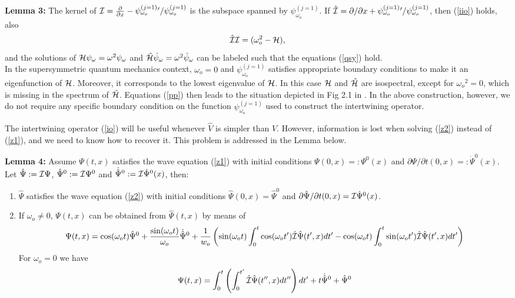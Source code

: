 \documentclass[aps,floats,showpacs,amssymb,tightenlines]{revtex4}
\def\w{\omega}
\def\p{\partial}
\def\I{{\cal I}}
\def\po{\psi_{\w_o}}
\def\pe{\psi_{\w_o}^{(j=1)}{}}
\begin{document}
\noindent
{\bf Lemma 3:}  The kernel of $\I = \frac{\p}{\p x} - \psi _{\w_o}^{(j=1)} {}' / \psi _{\w_o}^{(j=1)}$
is the subspace spanned by $\po ^{(j=1)}$.  If $ \hat \I  =  \p/\p x +
 \psi _{\w_o}^{(j=1)} {}' / \psi _{\w_o}^{(j=1)}$, then (\ref{iio}) holds, also
 \begin{equation} \label{inverse}
 \hat \I \I = (\w_o^2 - {\cal H}),
\end{equation}
  and  the solutions of ${\cal H} \psi_{\w} = \w^2 \psi_{\w}$ and $\hat {\cal H} \hat \psi_{\w} = \w^2 \hat \psi_{\w}$
can be labeled such that the equations (\ref{qsy}) hold.\\

In the supersymmetric quantum mechanics context, $\w_o=0$ and $\psi _{\w_o}^{(j=1)}$ satisfies appropriate boundary conditions to make it
 an eigenfunction of ${\cal H}$. Moreover, it  corresponds to the lowest eigenvalue of ${\cal H}$.
In this case  ${\cal H}$ and $\hat {\cal H}$ are isospectral, except for $\w_o{}^2=0$, which is missing in the spectrum of $\hat {\cal H}$.
 Equations (\ref{pp}) then leads to the situation
depicted in Fig 2.1 in \cite{cooper}. In the above construction, however, we do not require any specific boundary condition
on the function $\pe$ used to construct the intertwining operator.


\vspace{.3cm}

The intertwining  operator (\ref{io}) will be useful whenever  $\hat V$ is simpler than
$V$. However, information is lost when solving (\ref{z2}) instead of (\ref{z1}), and we need
to know how to recover it. This problem is addressed in the Lemma below.

\vspace{.3cm}

\noindent
{\bf Lemma 4:} Assume $\Psi(t,x)$ satisfies the wave equation (\ref{z1}) with initial conditions $\Psi(0,x)=: \Psi^0(x)$
 and $\p \Psi / \p t (0,x)=: \dot \Psi^0(x)$.
 Let $\hat \Psi := \I \Psi$,  $\hat \Psi ^0 := \I \Psi ^0$ and $\dot{\hat{\Psi}}^0 := \I  \dot \Psi^0(x)$, then:
 \begin{enumerate}
\item $\hat \Psi$ satisfies the wave equation (\ref{z2}) with
initial conditions $\hat \Psi(0,x)=\hat \Psi ^0$ and $\p \hat \Psi / \p t (0,x)= \I  \dot \Psi^0(x)$.
\item If $\w_o \neq 0$, $\Psi(t,x)$ can be obtained from $\hat \Psi (t,x)$ by means of
\begin{multline} \label{sol}
 \Psi(t,x) =  \cos (\w_o t) \hat \Psi ^0 + \frac{\sin (\w_o t)}{\w_o} \dot{\hat{\Psi}}^0
+ \frac{1}{w_o} \left(
\sin (\w_o t) \int_0^t \cos (\w_o t') \hat \I \hat \Psi(t',x) dt' -\cos (\w_o t) \int_0^t \sin (\w_o t') \hat \I \hat \Psi(t',x) dt' \right)
\end{multline}
For  $\w_o = 0$ we have
\begin{equation}  \label{sol2}
\Psi(t,x) = \int_0^t \left( \int_0^{t'} \hat \I \hat \Psi(t'',x) dt'' \right) dt' + t \dot{\hat{\Psi}}^0  + \hat \Psi ^0
\end{equation}
\end{enumerate}
\vspace{.3cm}
\end{document}
